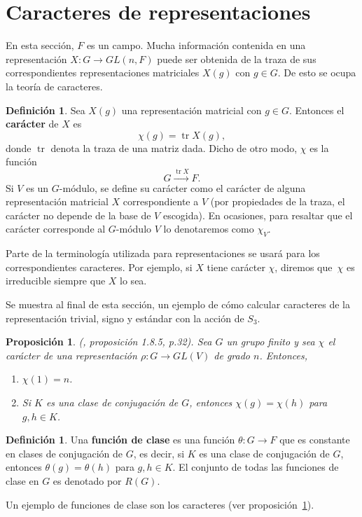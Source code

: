 \documentclass[12pt]{book}
\newtheorem{proposition}[theorem]{Proposición}
\theoremstyle{definition}
\newtheorem{definition}[theorem]{Definición}
\DeclareMathOperator{\tr}{tr}
\newcounter{in}
\newcounter{ini}
\begin{document}
\section{Caracteres de representaciones}
\label{caracteres}

En esta sección, $F$ es un campo. Mucha información contenida en una representación $X:G\rightarrow
GL(n,F)$ puede ser obtenida de la traza de sus
correspondientes representaciones matriciales $X(g)$ con $g\in G$. De
esto se ocupa la teoría de caracteres.

\begin{definition}
  Sea $X(g)$ una representación matricial con $g\in G$. Entonces el \textbf{carácter} de $X$ es
  \begin{equation*}
    \chi(g)=\tr X(g),
  \end{equation*}
  donde $\tr$ denota la traza de una matriz dada. Dicho de otro modo,
  $\chi$ es la función
\begin{equation*}
  G\stackrel{\tr X}{\rightarrow}F.
\end{equation*}
Si $V$ es un $G$-módulo, se define su carácter como el carácter de alguna
representación matricial $X$ correspondiente a $V$ (por propiedades de
la traza, el carácter no depende de la base de $V$ escogida). En ocasiones, para resaltar
que el carácter corresponde al $G$-módulo $V$ lo denotaremos como $\chi_{V}$.
\end{definition}

Parte de la terminología utilizada para representaciones se
usará para los correspondientes caracteres. Por ejemplo, si $X$ tiene
carácter $\chi$, diremos que~$\chi$ es irreducible siempre que $X$ lo
sea.

Se muestra al final de esta sección, un ejemplo de cómo calcular caracteres de la representación
trivial, signo y estándar con la acción de $S_{3}$.

\begin{proposition}{\normalfont (\cite{sagan2001symmetric}, proposición 1.8.5, p.32)}.
  Sea $G$ un grupo finito y sea $\chi$ el carácter de una
  representación $\rho:G\rightarrow GL(V)$ de grado $n$. Entonces,
  \begin{enumerate}
  \item $\chi(1)=n$.
  \item Si $K$ es una clase de conjugación de $G$, entonces $\chi(g)=\chi(h)$ para $g,h\in K$. 
  \end{enumerate}
\label{carac-const}
\end{proposition}
\begin{definition}
  Una \textbf{función de clase} es una función
  $\theta:G\rightarrow F$ que es constante en clases de
  conjugación de $G$, es decir, si $K$ es una clase de conjugación de
  $G$, entonces $\theta(g)=\theta(h)$ para $g,h\in K$. El conjunto de
  todas las funciones de clase en $G$ es denotado por $R(G)$.
\end{definition} 
Un ejemplo de funciones de clase son los caracteres (ver proposición~\ref{carac-const}).
\end{document}
